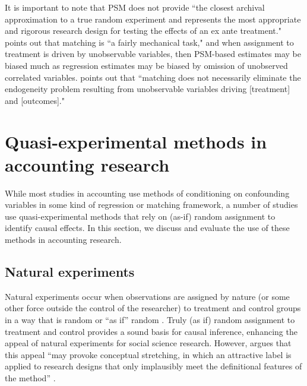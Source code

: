 \documentclass[11pt,reqno]{amsart}
\begin{document}
\begin{doublespace}
It is important to note that PSM does not provide ``the closest archival approximation to a true random experiment and represents the most appropriate and rigorous research design for testing the effects of an ex ante treatment."
\citet[pp.\,73-75]{Rosenbaum:2009ul} points out that matching is ``a fairly mechanical  task," and when assignment to treatment is driven by unobservable variables, then PSM-based estimates may be biased much as regression estimates may be biased by omission of unobserved correlated variables.
\citep{MinuttiMeza:2014fn} points out that ``matching does not necessarily eliminate the endogeneity problem resulting from unobservable variables driving [treatment] and [outcomes]."




\section{Quasi-experimental methods in accounting research}

While most studies in accounting use methods of conditioning on confounding variables in some kind of regression or matching framework, a number of studies use quasi-experimental methods that rely on (as-if) random assignment to identify causal effects.
In this section, we discuss and evaluate the use of these methods in accounting research.


\subsection{Natural experiments}
Natural experiments occur when observations are assigned by nature (or some other force outside the control of the researcher) to treatment and control groups in a way that is random or ``as if'' random \citep{Dunning:2012tt}. 
Truly (as if) random assignment to treatment and control provides a sound basis for causal inference, enhancing the appeal of natural experiments for social science research.
However, argues that this appeal ``may provoke conceptual stretching, in which an attractive label is applied to research designs that only implausibly meet the definitional features of the method'' \citep[p.3]{Dunning:2012tt}.


\end{doublespace}
\end{document}
